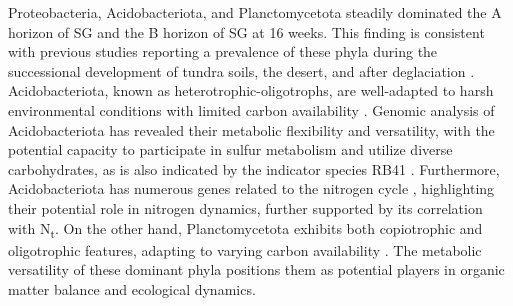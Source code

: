 Proteobacteria, Acidobacteriota, and Planctomycetota steadily dominated the A horizon of SG and the B horizon of SG at 16 weeks. This finding is consistent with previous studies reporting a prevalence of these phyla during the successional development of tundra soils, the desert, and after deglaciation \citep{Zhelezova2019, Yu2022, Shen2023}. Acidobacteriota, known as heterotrophic-oligotrophs, are well-adapted to harsh environmental conditions with limited carbon availability \citep{Fierer2007, Zhao2019}. Genomic analysis of Acidobacteriota has revealed their metabolic flexibility and versatility, with the potential capacity to participate in sulfur metabolism and utilize diverse carbohydrates, as is also indicated by the indicator species RB41 \citep{Eichorst2018, Kalam2020, Stone2021}. Furthermore, Acidobacteriota has numerous genes related to the nitrogen cycle \citep{Eichorst2018}, highlighting their potential role in nitrogen dynamics, further supported by its correlation with N\textsubscript{t}. On the other hand, Planctomycetota exhibits both copiotrophic and oligotrophic features, adapting to varying carbon availability \citep{Lauro2009}. The metabolic versatility of these dominant phyla positions them as potential players in organic matter balance and ecological dynamics.

